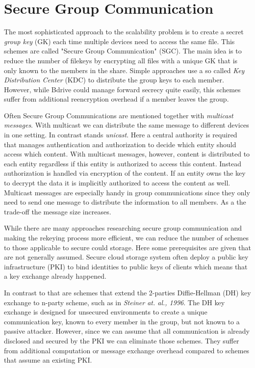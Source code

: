 \section{Secure Group Communication}
The most sophisticated approach to the scalability problem is to create a secret \textit{group key} (\ac{GK}) each time multiple devices need to access the same file. This schemes are called "Secure Group Communication" (\ac{SGC}). The main idea is to reduce the number of filekeys by encrypting all files with a unique \ac{GK} that is only known to the members in the share. Simple approaches use a so called \textit{Key Distribution Center} (\ac{KDC}) to distribute the group keys to each member. However, while Bdrive could manage forward secrecy quite easily, this schemes suffer from additional reencryption overhead if a member leaves the group. 

Often Secure Group Communications are mentioned together with \textit{multicast messages}. With multicast we can distribute the same message to different devices in one setting. In contrast stands \textit{unicast}. Here a central authority is required that manages authentication and authorization to decide which entity should access which content. With multicast messages, however, content is distributed to each entity regardless if this entity is authorized to access this content. Instead authorization is handled via encryption of the content. If an entity owns the key to decrypt the data it is implicitly authorized to access the content as well. Multicast messages are especially handy in group communications since they only need to send one message to distribute the information to all members. As a the trade-off the message size increases.

While there are many approaches researching secure group communication and making the rekeying process more efficient, we can reduce the number of schemes to those applicable to secure could storage. Here some prerequisites are given that are not generally assumed. Secure cloud storage system often deploy a public key infrastructure (\ac{PKI}) to bind identities to public keys of clients which means that a key exchange already happened.

In contrast to that are schemes that extend the 2-parties Diffie-Hellman (\ac{DH}) key exchange to n-party scheme, such as in \textit{Steiner at. al., 1996}\cite{steiner1996diffie}. The \ac{DH} key exchange is designed for unsecured environments to create a unique communication key, known to every member in the group, but not known to a passive attacker. However, since we can assume that all communication is already disclosed and secured by the \ac{PKI} we can eliminate those schemes. They suffer from additional computation or message exchange overhead compared to schemes that assume an existing \ac{PKI}.   

